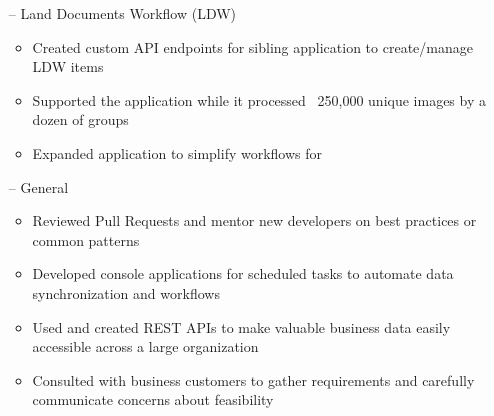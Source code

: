 \documentclass[line,overlapped,9pt]{res}
\begin{document}
\begin{resume}
\begin{itemize}
\begin{itemize}
                   \end{itemize}
                 \item[--] Land Documents Workflow (LDW) 
                   \begin{itemize}
                   \item Created custom API endpoints for sibling application to create/manage LDW items
                   \item Supported the application while it processed ~250,000 unique images by a dozen of groups 
                   \item Expanded application to simplify workflows for 
                   \end{itemize}
                 \item[--] General
                   \begin{itemize}
                   \item Reviewed Pull Requests and mentor new developers on best practices or common patterns
                   \item Developed console applications for scheduled tasks to automate data synchronization and workflows
                   \item Used and created REST APIs to make valuable business data easily accessible across a large organization 
                   \item Consulted with business customers to gather requirements and carefully communicate concerns about feasibility
                   \end{itemize}
                 \end{itemize}
                 

\end{resume}
\end{document}
